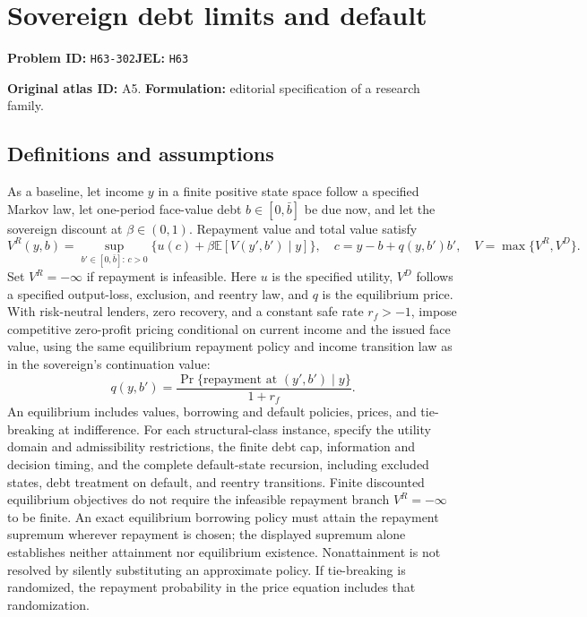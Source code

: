 \documentclass[11pt,a4paper]{article}
\begin{document}
\section*{Sovereign debt limits and default}
\textbf{Problem ID:} \texttt{H63-302}\quad \textbf{JEL:} \texttt{H63}\par
\label{problem:OP-0015}
\label{atlas:prob:A5}

\noindent\textbf{Original atlas ID:} A5. \textbf{Formulation:} editorial specification of a research family.

\subsection*{Definitions and assumptions}

As a baseline, let income $y$ in a finite positive state space follow a specified Markov law, let one-period face-value debt $b\in[0,\bar b]$ be due now, and let the sovereign discount at $\beta\in(0,1)$. Repayment value and total value satisfy
\[
V^R(y,b)=\sup_{b'\in[0,\bar b]:\,c>0}
 \{u(c)+\beta\mathbb E[V(y',b')\mid y]\},\quad
c=y-b+q(y,b')b',\quad V=\max\{V^R,V^D\}.
\]
Set $V^R=-\infty$ if repayment is infeasible. Here $u$ is the specified utility, $V^D$ follows a specified output-loss, exclusion, and reentry law, and $q$ is the equilibrium price. With risk-neutral lenders, zero recovery, and a constant safe rate $r_f>-1$, impose competitive zero-profit pricing conditional on current income and the issued face value, using the same equilibrium repayment policy and income transition law as in the sovereign's continuation value:
\[
q(y,b')=\frac{\Pr\{\text{repayment at }(y',b')\mid y\}}{1+r_f}.
\]
An equilibrium includes values, borrowing and default policies, prices, and tie-breaking at indifference. For each structural-class instance, specify the utility domain and admissibility restrictions, the finite debt cap, information and decision timing, and the complete default-state recursion, including excluded states, debt treatment on default, and reentry transitions. Finite discounted equilibrium objectives do not require the infeasible repayment branch $V^R=-\infty$ to be finite. An exact equilibrium borrowing policy must attain the repayment supremum wherever repayment is chosen; the displayed supremum alone establishes neither attainment nor equilibrium existence. Nonattainment is not resolved by silently substituting an approximate policy. If tie-breaking is randomized, the repayment probability in the price equation includes that randomization.
\end{document}
